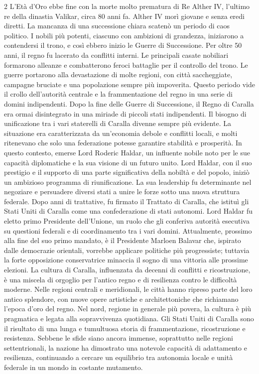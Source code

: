 \documentclass[10pt, a4paper]{report}
\begin{document}
\begin{multicols}{2}
L'Età d'Oro ebbe fine con la morte molto prematura di Re Alther IV, l'ultimo re della dinastia Valikar, circa 80 anni fa. Alther IV morì giovane e senza eredi diretti. La mancanza di una successione chiara scatenò un periodo di caos politico. I nobili più potenti, ciascuno con ambizioni di grandezza, iniziarono a contendersi il trono, e così ebbero inizio le Guerre di Successione.
Per oltre 50 anni, il regno fu lacerato da conflitti interni. Le principali casate nobiliari formarono alleanze e combatterono feroci battaglie per il controllo del trono. Le guerre portarono alla devastazione di molte regioni, con città saccheggiate, campagne bruciate e una popolazione sempre più impoverita. Questo periodo vide il crollo dell’autorità centrale e la frammentazione del regno in una serie di domini indipendenti.
Dopo la fine delle Guerre di Successione, il Regno di Caralla era ormai disintegrato in una miriade di piccoli stati indipendenti.
Il bisogno di unificazione tra i vari staterelli di Caralla divenne sempre più evidente. La situazione era caratterizzata da un'economia debole e conflitti locali, e molti ritenevano che solo una federazione potesse garantire stabilità e prosperità.
In questo contesto, emerse Lord Roderic Haldar, un influente nobile noto per le sue capacità diplomatiche e la sua visione di un futuro unito. Lord Haldar, con il suo prestigio e il supporto di una parte significativa della nobiltà e del popolo, iniziò un ambizioso programma di riunificazione. La sua leadership fu determinante nel negoziare e persuadere diversi stati a unire le forze sotto una nuova struttura federale. Dopo anni di trattative, fu firmato il Trattato di Caralla, che istituì gli Stati Uniti di Caralla come una confederazione di stati autonomi. Lord Haldar fu eletto primo Presidente dell'Unione, un ruolo che gli conferiva autorità esecutiva su questioni federali e di coordinamento tra i vari domini.
Attualmente, prossimo alla fine del suo primo mandato, è il Presidente Marloen Balavar che, ispirato dalle democrazie orientali, vorrebbe applicare politiche più progressiste; tuttavia la forte opposizione conservatrice minaccia il sogno di una vittoria alle prossime elezioni.
La cultura di Caralla, influenzata da decenni di conflitti e ricostruzione, è una miscela di orgoglio per l’antico regno e di resilienza contro le difficoltà moderne. Nelle regioni centrali e meridionali, le città hanno ripreso parte del loro antico splendore, con nuove opere artistiche e architettoniche che richiamano l'epoca d'oro del regno. Nel nord, regione in generale più povera, la cultura è più pragmatica e legata alla sopravvivenza quotidiana.
Gli Stati Uniti di Caralla sono il risultato di una lunga e tumultuosa storia di frammentazione, ricostruzione e resistenza. Sebbene le sfide siano ancora immense, soprattutto nelle regioni settentrionali, la nazione ha dimostrato una notevole capacità di adattamento e resilienza, continuando a cercare un equilibrio tra autonomia locale e unità federale in un mondo in costante mutamento.


\end{multicols}
\end{document}
